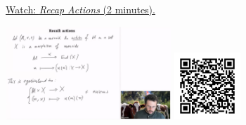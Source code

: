 
\begin{minipage}{10cm}
    \href{https://act4e-spring21.netlify.app/videos/spring2021-operads-b:actions-recap.html}{Watch: \emph{Recap Actions} (2 minutes).}
        
    \href{https://act4e-spring21.netlify.app/videos/spring2021-operads-b:actions-recap.html}{\includegraphics[height=3.5cm]{spring2021-operads-b:actions-recap/thumbnails.jpg}}
    \href{https://act4e-spring21.netlify.app/videos/spring2021-operads-b:actions-recap.html}{\includegraphics[height=2.5cm]{spring2021-operads-b:actions-recap/qrcode.png}}
\end{minipage}
